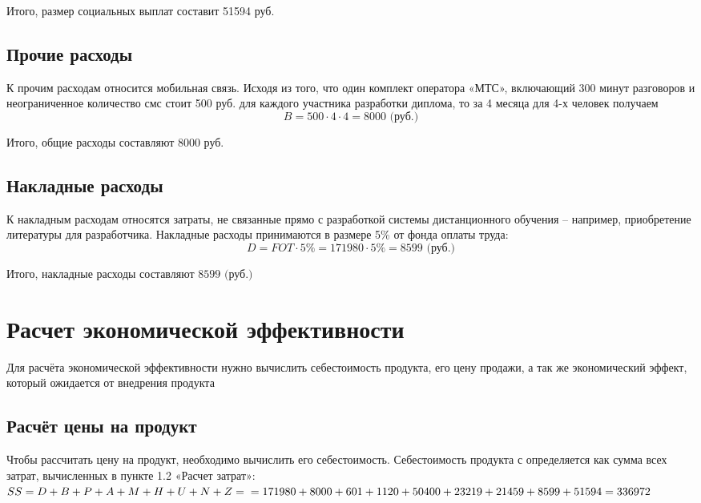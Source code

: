 Итого, размер социальных выплат составит 51594 руб.

\subsection{Прочие расходы}

К прочим расходам относится мобильная связь. Исходя из того, что один комплект оператора «МТС», включающий 300 минут разговоров и неограни\-ченное количество смс стоит 500 руб. для каждого участника разработки диплома, то за 4 месяца для 4-х человек получаем
$$
B = 500 \cdot 4 \cdot 4 = 8000 \mbox{ (руб.)}
$$

Итого, общие расходы составляют 8000 руб.

\subsection{Накладные расходы}

К накладным расходам относятся затраты, не связанные прямо с разработ\-кой системы дистанционного обучения – например, приобретение литературы для разработчика. Накладные расходы принимаются в размере 5\% от фонда оплаты труда:
$$
D = FOT \cdot 5\% = 171980 \cdot 5 \% = 8599 \mbox{ (руб.)}
$$

Итого, накладные расходы составляют $8599 \mbox{ (руб.)}$

\section{Расчет экономической эффективности}

Для расчёта экономической эффективности нужно вычислить се\-бесто\-имость продукта, его цену продажи, а так же экономический эффект, который ожида\-ется от внедрения продукта

\subsection{Расчёт цены на продукт}

Чтобы рассчитать цену на продукт, необходимо вычис\-лить его себесто\-имость. Се\-бестоимость продукта с определяется как сумма всех затрат, вычис\-ленных в пункте 1.2 «Расчет затрат»:\\
\begin{math}
SS = D + B + P + A+M+H+U+N+Z = \\ 
=171980 + 8000 + 601 + 1120 + 50400 + 23219 + 21459 + 8599 + 51594 = 336972
\end{math}

